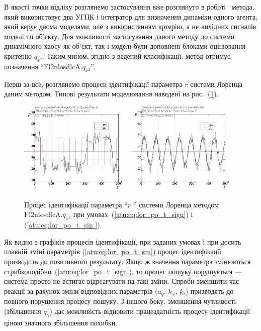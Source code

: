 В якості точки відліку розглянемо застосування вже розглянуто
в роботі~\cite{atu_phd_thesis}
метода, який використовує два УГПК і інтегратор для визначення динаміки одного агента,
який керує двома моделями, але з використянням кртерію, а не вихідних сигналів моделі тп об'єкту.
Для можливості застосування даного методу до системи
динамічного хаосу як об'єкт, так і моделі були доповнені блоками
оцінювання критерію
$ q_{x^2} $. Таким чином, згідно з ведений класифікації, метод
отримує позначення
``Fl2nlosdlcA.$q_{x^2}$''.

Перш за все, розглянемо процеси ідентифікації параметра
$ r $ системи Лоренца даним методом. Типові результати моделювання
наведені на рис.~(\ref{atu:f:lor_id_Fl2nlosdlcA_wp009}).

\begin{figure}[ht!]
  \centerline{
    \includegraphics[width=0.49\textwidth]{p/cha/lor/Fl2nlosdlcA/Fl2nlosdlcA-p_xz_1_wp009.png}
    \hfill
    \includegraphics[width=0.49\textwidth]{p/cha/lor/Fl2nlosdlcA/Fl2nlosdlcA-p_xz_0_wp009.png}
  }
\caption{Процес ідентифікації параметра ``$ r $ '' системи Лоренца методом Fl2nlosdlcA.$q_{x^2} $ при умовах~(\ref{atu:eq:lor_po_t_sign}) і (\ref{atu:eq:lor_po_t_sin })}
\label{atu:f:lor_id_Fl2nlosdlcA_wp009}
\end{figure}

Як видно з графіків процесів ідентифікації, при заданих умовах
і при досить плавній зміні параметрів (\ref{atu:eq:lor_po_t_sin}) процес
ідентифікації призводить до позитивного результату. Якщо ж
значення параметра змінюються стрибкоподібно~(\ref{atu:eq:lor_po_t_sign}),
то процес пошуку порушується --- система просто не встигає
відреагувати на такі зміни. Спроби зменшити час реакції за
рахунок зміни відповідних параметрів ($ a_q $,
$ k_\omega $,
$ k_i $) призводять до повного порушення процесу пошуку. З іншого
боку, зменшення чутливості (збільшення $ q_\gamma $) дає можливість відновити працездатність процесу
ідентифікації ціною значного збільшення похибки.

